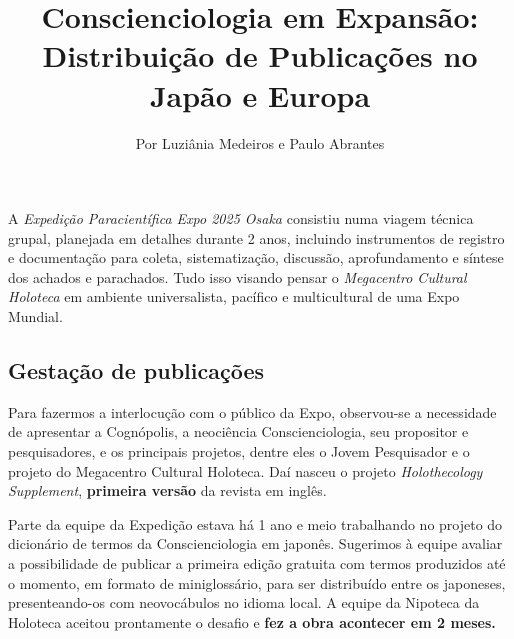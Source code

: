 \documentclass{gescons}
\author{Por Luziânia Medeiros e Paulo Abrantes}
\title{Conscienciologia em Expansão: Distribuição de Publicações no Japão e Europa}
\begin{document}
    \makeentrevistatitle


    




A \emph{Expedição Paracientífica Expo 2025 Osaka} consistiu numa viagem técnica grupal, planejada em detalhes durante 2 anos, incluindo instrumentos de registro e documentação para coleta, sistematização, discussão, aprofundamento e síntese dos achados e parachados. Tudo isso visando pensar o \emph{Megacentro Cultural Holoteca} em ambiente universalista, pacífico e multicultural de uma Expo Mundial.

\subsection*{Gestação de publicações}

Para fazermos a interlocução com o público da Expo, observou-se a necessidade de apresentar a Cognópolis, a neociência Conscienciologia, seu propositor e pesquisadores, e os principais projetos, dentre eles o Jovem Pesquisador e o projeto do Megacentro Cultural Holoteca. Daí nasceu o projeto \emph{Holothecology Supplement}, \textbf{primeira versão} da revista em inglês.

Parte da equipe da Expedição estava há 1 ano e meio trabalhando no projeto do dicionário de termos da Conscienciologia em japonês. Sugerimos à equipe avaliar a possibilidade de publicar a primeira edição gratuita com termos produzidos até o momento, em formato de miniglossário, para ser distribuído entre os japoneses, presenteando-os com neovocábulos no idioma local. A equipe da Nipoteca da Holoteca aceitou prontamente o desafio e \textbf{fez a obra acontecer em 2 meses.}
\end{document}
